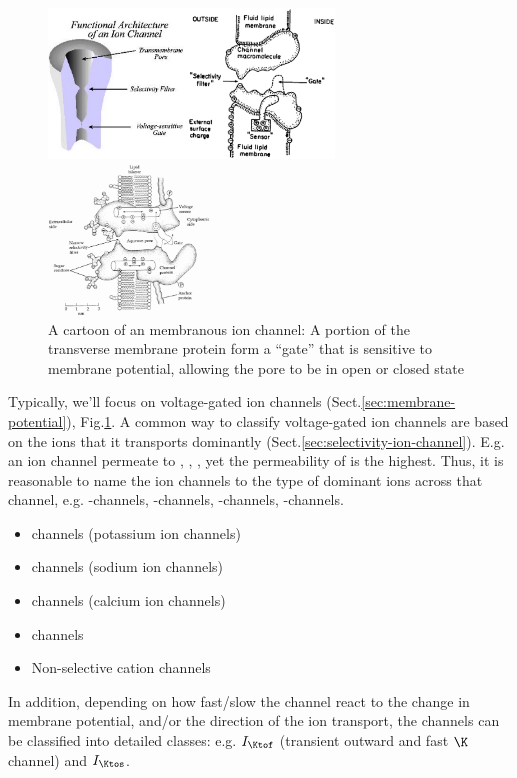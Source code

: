 \begin{figure}[htb]
  \centerline{\includegraphics[height=4cm]{./images/ionchannel_structure.eps}}
  \centerline{\includegraphics[height=4cm]{./images/cartoon_ion_channel.eps}}
  \caption{A cartoon of an membranous ion channel: A portion of the
    transverse membrane protein form a ``gate'' that is sensitive to
    membrane potential, allowing the pore to be in open or closed
    state}\label{fig:cartoon_ion_channel}
\end{figure}

Typically, we'll focus on voltage-gated ion channels
(Sect.\ref{sec:membrane-potential}), Fig.\ref{fig:cartoon_ion_channel}.
A common way to classify voltage-gated ion channels are based on the ions that
it transports dominantly (Sect.\ref{sec:selectivity-ion-channel}). E.g. an ion
channel permeate to , , , yet the permeability of
 is the highest. Thus, it is reasonable to name the ion channels to
the type of dominant ions across that channel, e.g. -channels,
-channels, -channels, -channels.
\begin{itemize}
\item {} channels (potassium ion channels)
\item {} channels (sodium ion channels)
\item {} channels (calcium ion channels)
\item {} channels
\item Non-selective cation channels
\end{itemize}
In addition, depending on how fast/slow the channel react to the change in
membrane potential, and/or the direction of the ion transport, the channels can
be classified into detailed classes: e.g. $I_\Ktof$ (transient outward and fast
$\K$ channel) and $I_\Ktos$.

